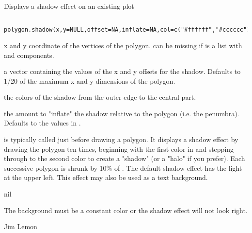 \begin{Description}\relax
Displays a shadow effect on an existing plot
\end{Description}
\begin{Usage}
\begin{verbatim}
 polygon.shadow(x,y=NULL,offset=NA,inflate=NA,col=c("#ffffff","#cccccc"))
\end{verbatim}
\end{Usage}
\begin{Arguments}
\begin{ldescription}
\item[\code{x,y}] x and y coordinate of the vertices of the polygon. 
can be missing if  is a list with  and  components.
\item[\code{offset}] a vector containing the values of the x and y offsets for the
shadow. Defaults to 1/20 of the maximum x and y dimensions of the polygon.
\item[\code{col}] the colors of the shadow from the outer edge to the central part.
\item[\code{inflate}] the amount to "inflate" the shadow relative to the polygon 
(i.e. the penumbra). Defaults to the values in .
\end{ldescription}
\end{Arguments}
\begin{Details}\relax
{} is typically called just before drawing a polygon.
It displays a shadow effect by drawing the polygon ten times, beginning 
with the first color in  and stepping through to the second
color to create a "shadow" (or a "halo" if you prefer). Each successive
polygon is shrunk by 10\% of . The default shadow effect has
the light at the upper left. This effect may also be used as a text
background.
\end{Details}
\begin{Value}
nil
\end{Value}
\begin{Note}\relax
The background must be a constant color or the shadow effect will not 
look right.
\end{Note}
\begin{Author}\relax
Jim Lemon
\end{Author}
\begin{SeeAlso}\relax
{}
\end{SeeAlso}
